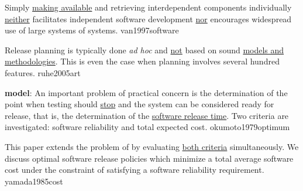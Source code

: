 \documentclass{article}
\begin{document}

  {Simply \ul{making available} and retrieving interdependent components individually \ul{neither} facilitates independent software development \ul{nor} encourages widespread use of large systems of systems.}
  {van1997software}

  {Release planning is typically done \textit{ad hoc} and \ul{not} based on sound \ul{models and methodologies}. This is even the case when planning involves several hundred features.}
  {ruhe2005art}


  {\textbf{ model}: An important problem of practical concern is the determination of the point when testing should \ul{stop} and the system can be considered ready for release, that is, the determination of the \ul{software release time}. Two criteria are investigated: software reliability and total expected cost.}
  {okumoto1979optimum}

  {This paper extends the problem of \citet{okumoto1979optimum} by evaluating \ul{both criteria} simultaneously. We discuss optimal software release policies which minimize a total average software cost under the constraint of satisfying a software reliability requirement.}
  {yamada1985cost}
\end{document}
